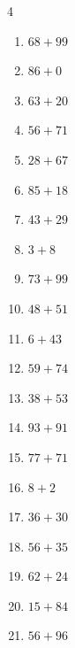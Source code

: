 \begin{multicols}{4}
\begin{enumerate}
  \item $68+99$
        \phantom{$=167$}

  \item $86+0$
        \phantom{$=86$}

  \item $63+20$
        \phantom{$=83$}

  \item $56+71$
        \phantom{$=127$}

  \item $28+67$
        \phantom{$=95$}

  \item $85+18$
        \phantom{$=103$}

  \item $43+29$
        \phantom{$=72$}

  \item $3+8$
        \phantom{$=11$}

  \item $73+99$
        \phantom{$=172$}

  \item $48+51$
        \phantom{$=99$}

  \item $6+43$
        \phantom{$=49$}

  \item $59+74$
        \phantom{$=133$}

  \item $38+53$
        \phantom{$=91$}

  \item $93+91$
        \phantom{$=184$}

  \item $77+71$
        \phantom{$=148$}

  \item $8+2$
        \phantom{$=10$}

  \item $36+30$
        \phantom{$=66$}

  \item $56+35$
        \phantom{$=91$}

\columnbreak %

  \item $62+24$
        \phantom{$=86$}

  \item $15+84$
        \phantom{$=99$}

  \item $56+96$
        \phantom{$=152$}


\end{enumerate}
\end{multicols}
